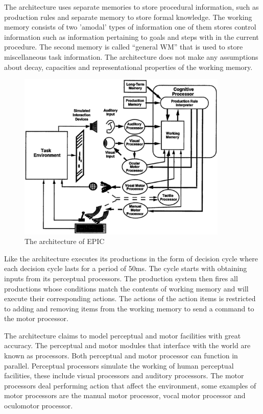 The \epic architecture uses separate memories to store procedural
information, such as production rules and separate memory to store
formal knowledge. The working memory consists of two 'amodal' types of
information one of them stores control information such as information
pertaining to goals and steps with in the current procedure. The
second memory is called ``general WM'' that is used to store
miscellaneous task information. The \epic architecture does not make
any assumptions about decay, capacities and representational
properties of the working memory\cite{citeulike:3439185}. 


\begin{figure}[htp]
  \centering
  \includegraphics[width=100mm]{EPIC.eps}
  \caption{The architecture of EPIC\cite{citeulike:3439185}}
  \label{EPIC_ARCH}
\end{figure}
Like \soar the \epic architecture executes its productions in the form
of decision cycle where each decision cycle lasts for a period of
50ms. The cycle starts with obtaining inputs from its perceptual
processors. The production system then fires all productions whose
conditions match the contents of working memory and will execute their
corresponding actions. The actions of the action items is restricted
to adding and removing items from the working memory to send a command
to the motor processor.

The \epic architecture claims to model perceptual and motor facilities
with great accuracy. The perceptual and motor modules that interface
with the world are known as processors. Both perceptual and motor
processor can function in parallel. Perceptual processors simulate
the working of human perceptual facilities, these include visual
processors and auditory processors. The motor processors deal
performing action that affect the environment, some examples of motor
processors are the manual motor processor, vocal motor processor and
oculomotor processor. 

